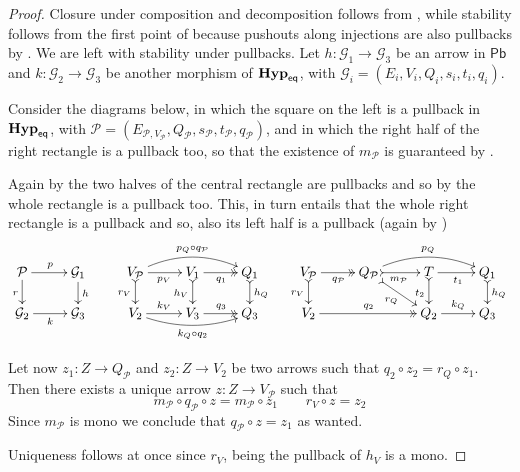 \documentclass[3p]{elsarticle}
\newcommand{\pbc}{\mathsf{Pb}}
\newcommand{\catname}[1]{\textbf{\textup{#1}}}
\newcommand{\EqHyp}{\catname{Hyp}_{\mathsf{eq}}} %
\theoremstyle{remark}
\theoremstyle{definition}
\begin{document}
\begin{proof}\label{proof:pbmono}
	Closure under composition and decomposition follows from , while stability follows from the first point of  because pushouts along injections are also pullbacks by . We are left with stability under pullbacks. 
	Let $h\colon \mathcal{G}_1\to \mathcal{G}_3$ be an arrow in $\pbc$ and $k\colon \mathcal{G}_2\to \mathcal{G}_3$ be another morphism of $\EqHyp$, with $\mathcal{G}_{i}=(E_i, V_i, Q_i, s_i, t_i, q_i)$.
	
	Consider the diagrams below, in which the square on the left is a pullback in $\EqHyp$, with $\mathcal{P}=(E_{\mathcal{P}, V_{\mathcal{P}}}, Q_{\mathcal{P}}, s_{\mathcal{P}}, t_{\mathcal{P}}, q_{\mathcal{P}})$, and in which the right half of the right rectangle is a pullback too, so that the existence of $m_\mathcal{P}$ is guaranteed by . 
	
	Again by  the two halves of the central rectangle are pullbacks and so by  the whole rectangle is a pullback too. This, in turn entails that the whole right rectangle is a pullback and so, also its left half is a pullback (again by )
	\[
	\xymatrix@R=15pt{\mathcal{P} \ar[r]^{p} \ar[d]_{r}&  \mathcal{G}_1 \ar[d]^{h} &
		V_{\mathcal{P}} \ar@/^.4cm/[rr]^{p_Q\circ q_{\mathcal{P}}} \ar[r]_{p_V} \ar@{>->}[d]_{r_V}& V_1  \ar@{>>}[r]_{q_1} \ar@{>->}[d]_{h_V}& Q_1 \ar@{>->}[d]^{h_Q}& V_{\mathcal{P}} \ar@{>>}[r]_{q_{\mathcal{P}}} \ar@{>->}[d]_{r_V} & Q_{\mathcal{P}} \ar@{>->}[dr]_{r_Q} \ar@/^.4cm/[rr]^{p_Q} \ar@{>->}[r]_{m_{\mathcal{P}}}& T \ar[r]_{t_1} \ar@{>->}[d]_{t_2} & Q_1 \ar@{>->}[d]^{h_Q}\\
		\mathcal{G}_2 \ar[r]_{k} & \mathcal{G}_3 &   V_2  \ar@/_.3cm/[rr]_{k_Q\circ q_2}\ar[r]^{k_V}& V_3 \ar@{>>}[r]^{q_3} & Q_3 &V_2 \ar@{>>}[rr]^{q_2}&& Q_2 \ar[r]^{k_Q} & Q_3 }
	\]
	
	
	
	Let now $z_1\colon Z\to Q_{\mathcal{P}}$ and $z_2\colon Z\to V_2$ be two arrows such that $q_2\circ z_2=r_Q\circ z_1$. Then there exists a unique arrow $z\colon Z\to V_{\mathcal{P}}$ such that
	\[m_{\mathcal{P}}\circ q_{\mathcal{P}}\circ z= m_{\mathcal{P}}\circ z_1 \qquad r_V\circ z=z_2\]
	Since $m_\mathcal{P}$ is mono we conclude that $q_{\mathcal{P}}\circ z=z_1$ as wanted.
	
	Uniqueness follows at once since $r_V$, being the pullback of $h_V$ is a mono.
\end{proof}
\end{document}
